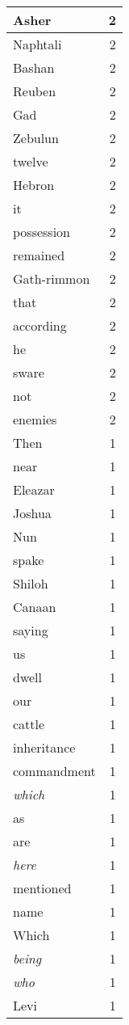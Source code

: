 \begin{center}
\begin{longtable}{l|r}
Asher & 2\\ \hline 
Naphtali & 2\\ \hline 
Bashan & 2\\ \hline 
Reuben & 2\\ \hline 
Gad & 2\\ \hline 
Zebulun & 2\\ \hline 
twelve & 2\\ \hline 
Hebron & 2\\ \hline 
it & 2\\ \hline 
possession & 2\\ \hline 
remained & 2\\ \hline 
Gath-rimmon & 2\\ \hline 
that & 2\\ \hline 
according & 2\\ \hline 
he & 2\\ \hline 
sware & 2\\ \hline 
not & 2\\ \hline 
enemies & 2\\ \hline 
Then & 1\\ \hline 
near & 1\\ \hline 
Eleazar & 1\\ \hline 
Joshua & 1\\ \hline 
Nun & 1\\ \hline 
spake & 1\\ \hline 
Shiloh & 1\\ \hline 
Canaan & 1\\ \hline 
saying & 1\\ \hline 
us & 1\\ \hline 
dwell & 1\\ \hline 
our & 1\\ \hline 
cattle & 1\\ \hline 
inheritance & 1\\ \hline 
commandment & 1\\ \hline 
\emph{which} & 1\\ \hline 
as & 1\\ \hline 
are & 1\\ \hline 
\emph{here} & 1\\ \hline 
mentioned & 1\\ \hline 
name & 1\\ \hline 
Which & 1\\ \hline 
\emph{being} & 1\\ \hline 
\emph{who} & 1\\ \hline 
Levi & 1\\ \hline 

\end{longtable}
\end{center}
